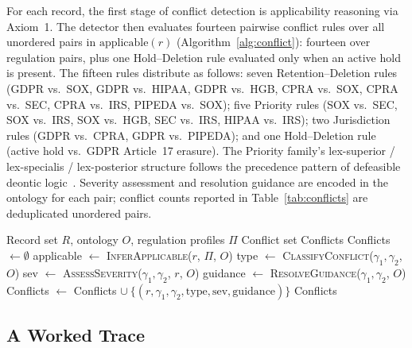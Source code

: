 \documentclass{ieeeaccess}
\begin{document}
For each record, the first stage of conflict detection is applicability reasoning via Axiom~1. The detector then evaluates fourteen pairwise conflict rules over all unordered pairs in $\mathrm{applicable}(r)$ (Algorithm~\ref{alg:conflict}): fourteen over regulation pairs, plus one Hold--Deletion rule evaluated only when an active hold is present. The fifteen rules distribute as follows: seven Retention--Deletion rules (GDPR vs.\ SOX, GDPR vs.\ HIPAA, GDPR vs.\ HGB, CPRA vs.\ SOX, CPRA vs.\ SEC, CPRA vs.\ IRS, PIPEDA vs.\ SOX); five Priority rules (SOX vs.\ SEC, SOX vs.\ IRS, SOX vs.\ HGB, SEC vs.\ IRS, HIPAA vs.\ IRS); two Jurisdiction rules (GDPR vs.\ CPRA, GDPR vs.\ PIPEDA); and one Hold--Deletion rule (active hold vs.\ GDPR Article~17 erasure). The Priority family's lex-superior / lex-specialis / lex-posterior structure follows the precedence pattern of defeasible deontic logic~\cite{governatori2013}. Severity assessment and resolution guidance are encoded in the ontology for each pair; conflict counts reported in Table~\ref{tab:conflicts} are deduplicated unordered pairs.

\begin{algorithm}[t]
\caption{Conflict Detection}
\label{alg:conflict}
\begin{algorithmic}[1]
\Require Record set $R$, ontology $O$, regulation profiles $\Pi$
\Ensure Conflict set Conflicts
\State Conflicts $\gets \emptyset$
    \State applicable $\gets$ \textsc{InferApplicable}($r$, $\Pi$, $O$)
            \State type $\gets$ \textsc{ClassifyConflict}($\gamma_1, \gamma_2$, $O$)
            \State sev $\gets$ \textsc{AssessSeverity}($\gamma_1, \gamma_2$, $r$, $O$)
            \State guidance $\gets$ \textsc{ResolveGuidance}($\gamma_1, \gamma_2$, $O$)
            \State Conflicts $\gets$ Conflicts $\cup\ \{(r, \gamma_1, \gamma_2, \mathrm{type}, \mathrm{sev}, \mathrm{guidance})\}$
        \EndIf
    \EndFor
\EndFor
\State \Return Conflicts
\end{algorithmic}
\end{algorithm}

\subsection{A Worked Trace}
\end{document}
